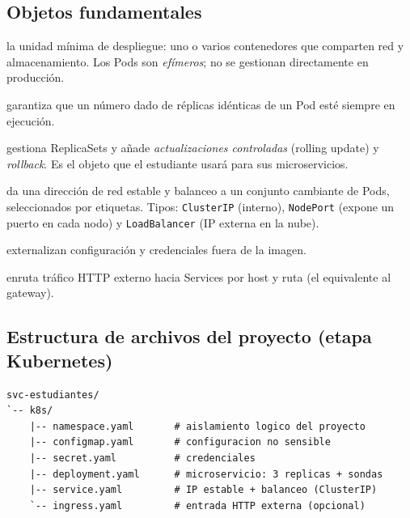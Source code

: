 \documentclass[11pt,a4paper]{article}
\begin{document}
\subsection{Objetos fundamentales}

\begin{description}[leftmargin=1.4em,style=nextline]
\item[Pod] la unidad m\'inima de despliegue: uno o varios contenedores que comparten red y almacenamiento. Los Pods son \emph{ef\'imeros}; no se gestionan directamente en producci\'on.
\item[ReplicaSet] garantiza que un n\'umero dado de r\'eplicas id\'enticas de un Pod est\'e siempre en ejecuci\'on.
\item[Deployment] gestiona ReplicaSets y a\~nade \emph{actualizaciones controladas} (rolling update) y \emph{rollback}. Es el objeto que el estudiante usar\'a para sus microservicios.
\item[Service] da una direcci\'on de red estable y balanceo a un conjunto cambiante de Pods, seleccionados por etiquetas. Tipos: \texttt{ClusterIP} (interno), \texttt{NodePort} (expone un puerto en cada nodo) y \texttt{LoadBalancer} (IP externa en la nube).
\item[ConfigMap / Secret] externalizan configuraci\'on y credenciales fuera de la imagen.
\item[Ingress] enruta tr\'afico HTTP externo hacia Services por host y ruta (el equivalente al gateway).
\end{description}

\subsection{Estructura de archivos del proyecto (etapa Kubernetes)}

\begin{lstlisting}[basicstyle=\ttfamily\footnotesize,numbers=none]
svc-estudiantes/
`-- k8s/
    |-- namespace.yaml       # aislamiento logico del proyecto
    |-- configmap.yaml       # configuracion no sensible
    |-- secret.yaml          # credenciales
    |-- deployment.yaml      # microservicio: 3 replicas + sondas
    |-- service.yaml         # IP estable + balanceo (ClusterIP)
    `-- ingress.yaml         # entrada HTTP externa (opcional)
\end{lstlisting}
\end{document}
